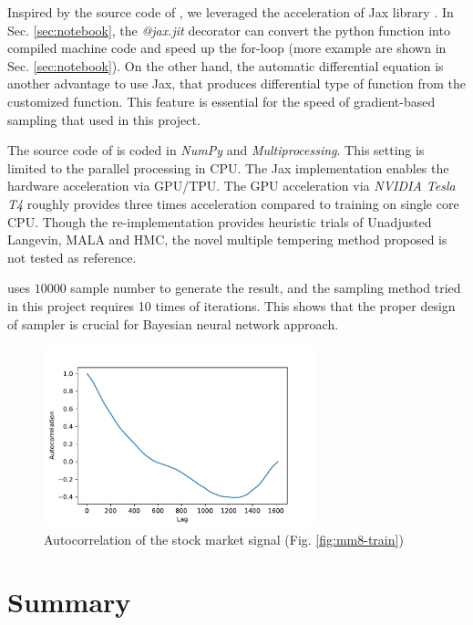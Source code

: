 \documentclass{article}
\begin{document}
Inspired by the source code of \cite{chandra2021bayesian}, we leveraged the acceleration of Jax library \citep{jax2018github}. In Sec. \ref{sec:notebook}, the \textit{@jax.jit} decorator can convert the python function into compiled machine code and speed up the for-loop (more example are shown in Sec. \ref{sec:notebook}). On the other hand, the automatic differential equation is another advantage to use Jax, that produces differential type of function from the customized function. This feature is essential for the speed of gradient-based sampling that used in this project. 

The source code of \cite{chandra2021bayesian} is coded in \textit{NumPy} and \textit{Multiprocessing}. This setting is limited to the parallel processing in CPU. The Jax implementation enables the hardware acceleration via GPU/TPU. The GPU acceleration via \textit{NVIDIA Tesla T4} roughly provides three times acceleration compared to training on single core CPU. Though the re-implementation provides heuristic trials of Unadjusted Langevin, MALA and HMC, the novel multiple tempering method proposed \citep{chandra2019langevin} is not tested as reference.

\cite{chandra2021bayesian} uses $10000$ sample number to generate the result, and the sampling method tried in this project requires 10 times of iterations. This shows that the proper design of sampler is crucial for Bayesian neural network approach.





\begin{figure}[htb]
    \centering
    \includegraphics[width=0.7\textwidth]{../img/autocorrelation.pdf}
    \caption{Autocorrelation of the stock market signal (Fig. \ref{fig:mm8-train})}
    \label{fig:auto}
\end{figure}

\section{Summary}
\end{document}
